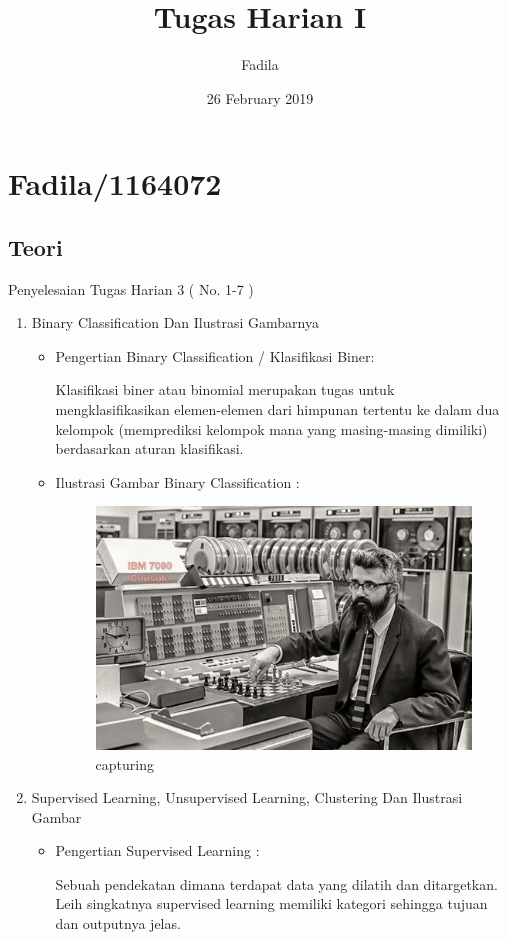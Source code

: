 \documentclass{article}
\title{Tugas Harian I}
\author{ Fadila }
\date{26 February 2019}
\begin{document}
\maketitle

\section{Fadila/1164072}
\subsection{Teori}
Penyelesaian Tugas Harian 3 ( No. 1-7 )
\begin{enumerate}
\item Binary Classification Dan Ilustrasi Gambarnya
\begin{itemize}
\item Pengertian Binary Classification / Klasifikasi Biner:
\par Klasifikasi biner atau binomial merupakan tugas untuk mengklasifikasikan elemen-elemen dari himpunan tertentu ke dalam dua kelompok (memprediksi kelompok mana yang masing-masing dimiliki) berdasarkan aturan klasifikasi.
\item Ilustrasi Gambar Binary Classification :
\par

\begin{figure}[ht]
\centering
\includegraphics[scale=0.5]{figures/contoh.jpg}
\caption{capturing}
\label{contoh}
\end{figure}

\par
\end{itemize}
\item Supervised Learning, Unsupervised Learning, Clustering Dan Ilustrasi Gambar
\begin{itemize}
\item Pengertian Supervised Learning :
\par Sebuah pendekatan dimana terdapat data yang dilatih dan ditargetkan. Leih singkatnya supervised learning memiliki kategori sehingga tujuan dan outputnya jelas.
\par


\end{itemize}
\end{enumerate}
\end{document}

